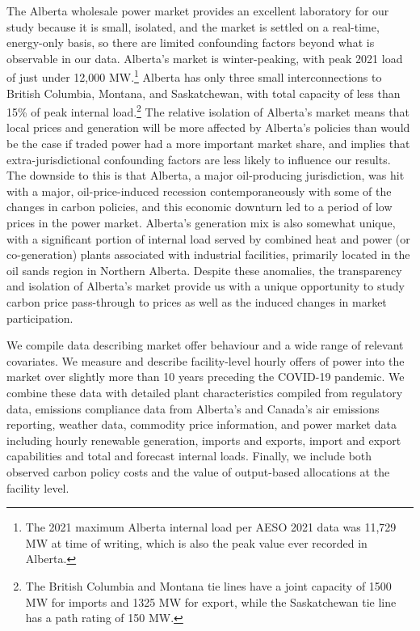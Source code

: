 \documentclass[12pt]{article}
\begin{document}
The Alberta wholesale power market provides an excellent laboratory for our study because it is small, isolated, and the market is settled on a real-time, energy-only basis, so there are limited confounding factors beyond what is observable in our data. Alberta's market is winter-peaking, with peak 2021 load of just under 12,000 MW.\footnote{The 2021 maximum Alberta internal load per AESO 2021 data was 11,729 MW at time of writing, which is also the peak value ever recorded in Alberta.} Alberta has only three small interconnections to British Columbia, Montana, and Saskatchewan, with total capacity of less than 15\% of peak internal load.\footnote{The British Columbia and Montana tie lines have a joint capacity of 1500 MW for imports and 1325 MW for export, while the Saskatchewan tie line has a path rating of 150 MW.} The relative isolation of Alberta's market means that local prices and generation will be more affected by Alberta's policies than would be the case if traded power had a more important market share, and implies that extra-jurisdictional confounding factors are less likely to influence our results. The downside to this is that Alberta, a major oil-producing jurisdiction, was hit with a major, oil-price-induced recession contemporaneously with some of the changes in carbon policies, and this economic downturn led to a period of low prices in the power market. Alberta's generation mix is also somewhat unique, with a significant portion of internal load served by combined heat and power (or co-generation) plants associated with industrial facilities, primarily located in the oil sands region in Northern Alberta. Despite these anomalies, the transparency and isolation of Alberta's market provide us with a unique opportunity to study carbon price pass-through to prices as well as the induced changes in market participation.

We compile data describing market offer behaviour and a wide range of relevant covariates. We measure and describe facility-level hourly offers of power into the market over slightly more than 10 years preceding the COVID-19 pandemic. We combine these data with detailed plant characteristics compiled from regulatory data, emissions compliance data from Alberta's and Canada's air emissions reporting, weather data, commodity price information, and power market data including hourly renewable generation, imports and exports, import and export capabilities and total and forecast internal loads. Finally, we include both observed carbon policy costs and the value of output-based allocations at the facility level.
\end{document}
